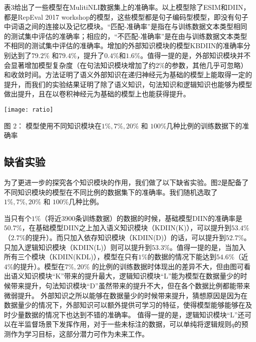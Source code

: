 \documentclass[UTF8,11pt,a4paper,nofonts]{ctexart}
\begin{document}
表3给出了一些模型在MulitiNLI数据集上的准确率。以上模型除了ESIM和DIIN，都是RepEval 2017 workshop的模型，这些模型都是句子编码型模型，即没有句子中词语之间的连接以及记忆模块。“匹配-准确率”是指在与训练数据文本类型相同的测试集中评估的准确率；相应的，“不匹配-准确率”是在由与训练数据文本类型不相同的测试集中评估的准确率。增加的外部知识模块的模型KBDIIN的准确率分别达到了$79.2\%$ 和$79.4\%$，提升了$0.4\%$和$1.6\%$。值得一提的是，外部知识模块并不会显著增加模型复杂度（在句法知识模块增加了约$2\%$的参数，其他几乎可忽略）和收敛时间。\cite{Chen2017NaturalLI}方法证明了语义外部知识在递归神经元为基础的模型上能取得一定的提升，而我们的实验结果证明了除了语义知识，句法知识和逻辑知识也能够为模型做出提升，且在以卷积神经元为基础的模型上也能获得提升。



\begin{table}[htbp!]
\centering
\texttt{[image: ratio]}
\caption*{图 2： 模型使用不同知识模块在$1\%, 7\%, 20\%$ 和 $100\%$几种比例的训练数据下的准确率}%
\end{table}


\subsection{缺省实验}

为了更进一步的探究各个知识模块的作用，我们做了以下缺省实验。图2是配备了不同知识模块的模型在不同比例的数据集下的准确率。我们随机选取了$1\%, 7\%, 20\%$ 和 $100\%$几种比例。



当只有个$1\%$（将近3900条训练数据）的数据的时候，基础模型DIIN的准确率是$50.7\%$，在基础模型DIIN之上加入语义知识模块（KDIIN(K)），可以提升到$53.4\%$（$2.7\%$的提升）。而只加入依存知识模块（KDIIN(D)）的话，可以提升到$52.7\%$。只加入逻辑知识模块（KDIIN(L)）则可以提升到$53.3\%$。值得一提的是，当加入所有三个模块（KDIIN(KDL)），模型在只有$1\%$的数据的情况下能达到$54.6\%$（近$4\%$的提升）。模型在$7\%, 20\%$ 的比例的训练数据时体现出的差异不大，但由图可看出语义知识模块“K”带来的提升最大，逻辑知识模块“L”能为模型在数据量少的时候带来提升，句法知识模块“D”虽然带来的提升不大，但在各个数据比例都能带来微弱提升。
外部知识之所以能够在数据量少的时候带来提升，猜想原因是因为在数据量少的情况下，外部知识可以额外提供可学习的特征，使得模型能够能够在及时少量数据的情况下也达到不错的准确率。
值得一提的是，逻辑知识模块“L”还可以在半监督场景下发挥作用，对于一些未标注的数据，可以单纯将逻辑规则$q$的预测作为学习目标，这部分潜力可作为未来工作。
\end{document}
